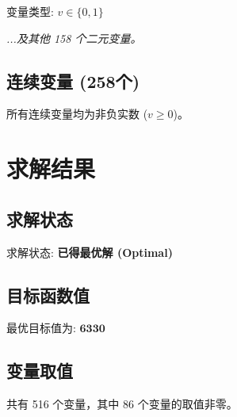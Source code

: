 \documentclass[a4paper,10pt]{article}
\begin{document}
变量类型: $v \in \{0,1\}$

\textit{...及其他 158 个二元变量。}

\subsection{连续变量 (258个)}

所有连续变量均为非负实数 ($v \geq 0$)。

\section{求解结果}

\subsection{求解状态}

求解状态: \textbf{已得最优解 (Optimal)}

\subsection{目标函数值}

最优目标值为: $\mathbf{6330}$

\subsection{变量取值}

共有 516 个变量，其中 86 个变量的取值非零。
\end{document}
